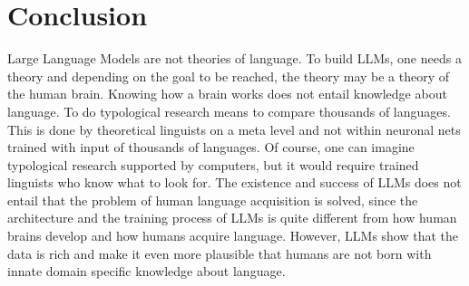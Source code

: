 \section{Conclusion}
\label{sec-LLMs-conclusion}

Large Language Models are not theories of language. To build LLMs, one needs a theory and depending
on the goal to be reached, the theory may be a theory of the human brain. Knowing how a brain works does not entail knowledge about language. To do typological research means to compare
thousands of languages. This is done by theoretical linguists on a meta level and not within
neuronal nets trained with input of thousands of languages. Of course, one can imagine typological
research supported by computers, but it would require trained linguists who know what to look for.
The existence and success of LLMs does not entail
that the problem of human language acquisition is solved, since the architecture and the training
process of LLMs is quite different from how human brains develop and how humans acquire
language. However, LLMs show that the data is rich and make it even more plausible that humans are
not born with innate domain specific knowledge about language.





